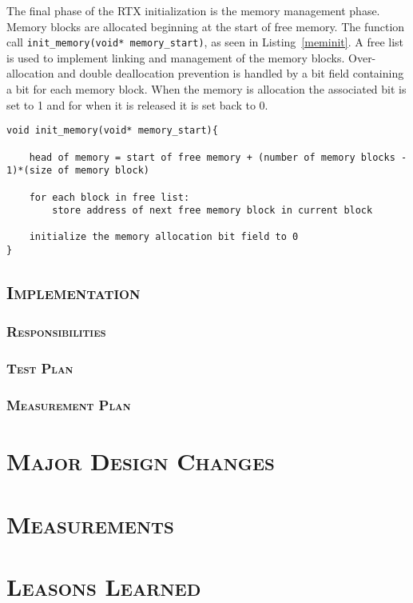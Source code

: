 \documentclass[oneside]{report}
\begin{document}
The final phase of the RTX initialization is the memory management phase.
Memory blocks are allocated beginning at the start of free memory. The function
call \texttt{init\_memory(void* memory\_start)}, as seen in
Listing~\ref{meminit}. A free list is used to implement linking and management
of the memory blocks. Over-allocation and double deallocation prevention is 
handled by a bit field containing a bit for each memory block. When the memory 
is allocation the associated bit is set to 1 and for when it is released it is 
set back to 0.

\begin{lstlisting}
void init_memory(void* memory_start){
    
    head of memory = start of free memory + (number of memory blocks - 1)*(size of memory block)
    
    for each block in free list:
        store address of next free memory block in current block

    initialize the memory allocation bit field to 0
}
\end{lstlisting}


\section{\textsc{Implementation}}

\subsection{\textsc{Responsibilities}}

\subsection{\textsc{Test Plan}}

\subsection{\textsc{Measurement Plan}}

\chapter{\textsc{Major Design Changes}}

\chapter{\textsc{Measurements}}

\chapter{\textsc{Leasons Learned}}
\end{document}
